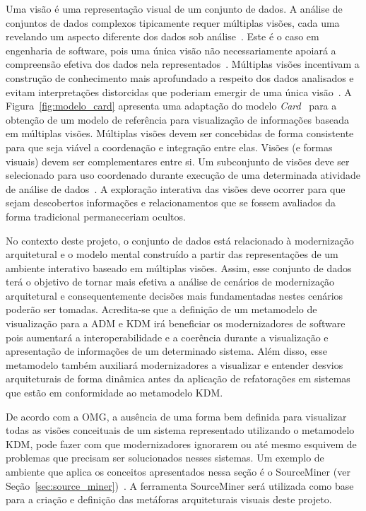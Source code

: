 \documentclass[12pt]{article}
\begin{document}
Uma visão é uma representação visual de um conjunto de dados. A análise de conjuntos de dados complexos tipicamente requer múltiplas visões, cada uma revelando um aspecto diferente dos dados sob análise~\cite{Boukhelifa_2003}. Este é o caso em engenharia de software, pois uma única visão não necessariamente apoiará a compreensão efetiva dos dados nela representados~\cite{Storey_2006}. Múltiplas visões incentivam a construção de conhecimento mais aprofundado a respeito dos dados analisados e evitam interpretações distorcidas que poderiam emergir de uma única visão~\cite{Ainsworth_1999}. A Figura~\ref{fig:modelo_card} apresenta uma adaptação do modelo \textit{Card}~\cite{source_miner_glauco} para a obtenção de um modelo de referência para visualização de informações baseada em múltiplas visões. Múltiplas visões devem ser concebidas de forma consistente para que seja viável a coordenação e integração entre elas. Visões (e formas visuais) devem ser complementares entre si. Um subconjunto de visões deve ser selecionado para uso coordenado durante execução de uma determinada atividade de análise de dados~\cite{WangBaldonado_2000}. A exploração interativa das visões deve ocorrer para que sejam descobertos informações e relacionamentos que se fossem avaliados da forma tradicional permaneceriam ocultos. 

No contexto deste projeto, o conjunto de dados está relacionado à modernização arquitetural e o modelo mental construído a partir das representações de um ambiente interativo baseado em múltiplas visões. Assim, esse conjunto de dados terá o objetivo de tornar mais efetiva a análise de cenários de modernização arquitetural e consequentemente decisões mais fundamentadas nestes cenários poderão ser tomadas. Acredita-se que a definição de um metamodelo de visualização para a ADM e KDM irá beneficiar os modernizadores de software pois aumentará a interoperabilidade e a coerência durante a visualização e apresentação de informações de um determinado sistema. Além disso, esse metamodelo também auxiliará modernizadores a visualizar e entender desvios arquiteturais de forma dinâmica antes da aplicação de refatorações em sistemas que estão em conformidade ao metamodelo KDM. 

De acordo com a OMG, a ausência de uma forma bem definida para visualizar todas as visões conceituais de um sistema representado utilizando o metamodelo KDM, pode fazer com que modernizadores ignorarem ou até mesmo esquivem de problemas que precisam ser solucionados nesses sistemas. Um exemplo de ambiente que aplica os conceitos apresentados nessa seção é o SourceMiner (ver Seção~\ref{sec:source_miner})~\cite{source_miner_glauco}. A ferramenta  SourceMiner será utilizada como base para a criação e definição das metáforas arquiteturais visuais deste projeto. 
\end{document}
